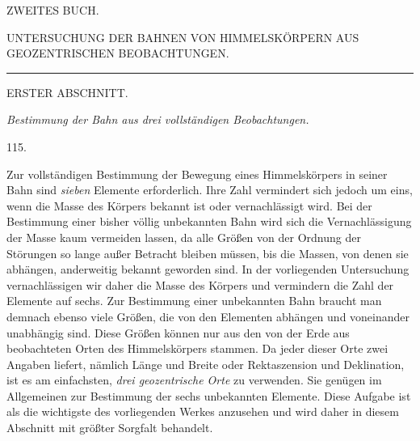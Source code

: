 \clearpage
{}
\begin{center}
{\Large ZWEITES BUCH.}\par\bigskip
{\large UNTERSUCHUNG DER BAHNEN VON HIMMELSKÖRPERN AUS GEOZENTRISCHEN BEOBACHTUNGEN.}\par\bigskip
\rule{3em}{.3pt}\par\bigskip
{}
{\large ERSTER ABSCHNITT.}\par\medskip
\emph{Bestimmung der Bahn aus drei vollständigen Beobachtungen.}\par\bigskip
\hypertarget{native-161-article115}{}115.
\end{center}
Zur vollständigen Bestimmung der Bewegung eines Himmelskörpers in seiner Bahn sind \emph{sieben} Elemente erforderlich. Ihre Zahl vermindert sich jedoch um eins, wenn die Masse des Körpers bekannt ist oder vernachlässigt wird. Bei der Bestimmung einer bisher völlig unbekannten Bahn wird sich die Vernachlässigung der Masse kaum vermeiden lassen, da alle Größen von der Ordnung der Störungen so lange außer Betracht bleiben müssen, bis die Massen, von denen sie abhängen, anderweitig bekannt geworden sind. In der vorliegenden Untersuchung vernachlässigen wir daher die Masse des Körpers und vermindern die Zahl der Elemente auf sechs. Zur Bestimmung einer unbekannten Bahn braucht man demnach ebenso viele Größen, die von den Elementen abhängen und voneinander unabhängig sind. Diese Größen können nur aus den von der Erde aus beobachteten Orten des Himmelskörpers stammen. Da jeder dieser Orte zwei Angaben liefert, nämlich Länge und Breite oder Rektaszension und Deklination, ist es am einfachsten, \emph{drei geozentrische Orte} zu verwenden. Sie genügen im Allgemeinen zur Bestimmung der sechs unbekannten Elemente. Diese Aufgabe ist als die wichtigste des vorliegenden Werkes anzusehen und wird daher in diesem Abschnitt mit größter Sorgfalt behandelt.

